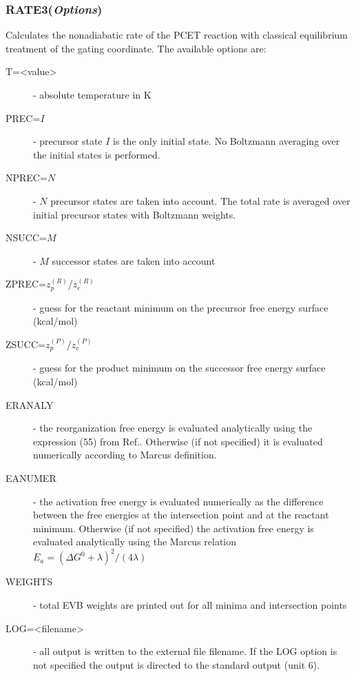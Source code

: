 \documentclass[oneside,11pt,openany]{book}
\newcommand{\tw}{\ttfamily}
\begin{document}
\subsubsection*{RATE3({\it Options})}
%
Calculates the nonadiabatic rate of the PCET reaction
with classical equilibrium treatment of the gating coordinate.
The available options are:
%
\begin{description}
%
\item[{\tw T=<value>}] - absolute temperature in K

\item[{\tw PREC=$I$}] - precursor state $I$ is the only initial state.
	 No Boltzmann averaging over the initial states
	 is performed.

\item[{\tw NPREC=$N$}] - $N$ precursor states are taken into account.
	  The total rate is averaged over initial
	  precursor states with Boltzmann weights.

\item[{\tw NSUCC=$M$}] - $M$ successor states are taken into account

\item[{\tw ZPREC=$z_p^{(R)}$/$z_e^{(R)}$}] - guess for the reactant minimum
             on the precursor free energy surface (kcal/mol)

\item[{\tw ZSUCC=$z_p^{(P)}$/$z_e^{(P)}$}] - guess for the product minimum
             on the successor free energy surface (kcal/mol)

\item[{\tw ERANALY}] - the reorganization free energy is evaluated analytically
	  using the expression (55) from Ref.\cite{pcet-jcp2}.
	  Otherwise (if not specified) it is evaluated
	  numerically according to Marcus definition.

\item[{\tw EANUMER}] - the activation free energy is evaluated numerically
	  as the difference between the free energies at the
	  intersection point and at the reactant minimum.
	  Otherwise (if not specified) the activation free
	  energy is evaluated analytically using the Marcus
	  relation $E_a=(\Delta G^0+\lambda)^2/(4\lambda)$

\item[{\tw WEIGHTS}] - total EVB weights are printed out for all minima
	  and intersection points

\item[{\tw LOG=<filename>}] - all output is written to the external file
		 {\tw filename}. If the {\tw LOG} option is not specified
		 the output is directed to the standard output
		 (unit 6).


\end{description}
\end{document}
